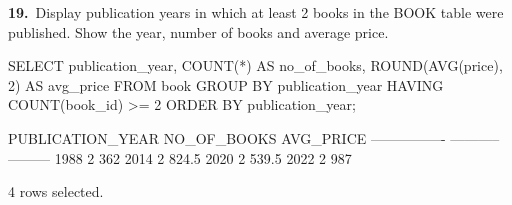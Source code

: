 \noindent\begin{minipage}{\linewidth}
\begingroup{}
{\fontsize{14}{17}\selectfont\textbf{19.}}\ Display publication years in which at least 2 books in the BOOK table were published. Show the year, number of books and average price.\par
\endgroup\vspace{12pt}


\begin{sqlcode}
SELECT publication_year, COUNT(*) AS no_of_books,
       ROUND(AVG(price), 2) AS avg_price
FROM book
GROUP BY publication_year
HAVING COUNT(book_id) >= 2
ORDER BY publication_year;
\end{sqlcode}

\vspace{18pt}


\begin{sqlout}[fontsize=\small]
PUBLICATION_YEAR  NO_OF_BOOKS  AVG_PRICE
----------------  -----------  ---------
            1988            2        362
            2014            2      824.5
            2020            2      539.5
            2022            2        987

4 rows selected.
\end{sqlout}
\end{minipage}\par\vspace{24pt}


